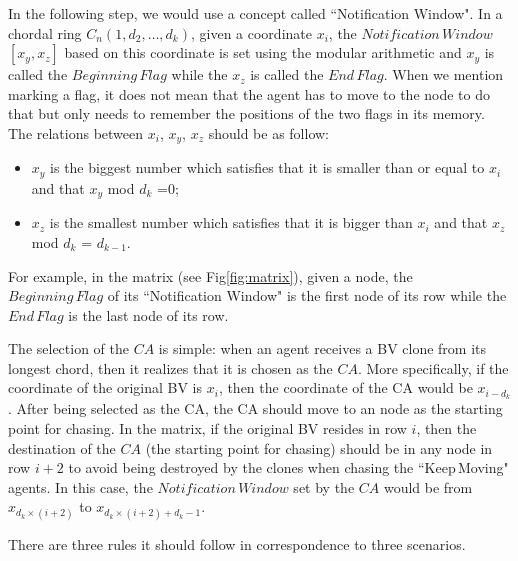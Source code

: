 In the following step, we would use a concept called ``Notification Window". In a chordal ring $C_n(1, d_2, \ldots, d_k)$, given a coordinate $x_i$, the $Notification\,Window$ $[x_y,x_z]$ based on this coordinate is set using the modular arithmetic and $x_y$ is called the $Beginning\,Flag$ while the $x_z$ is called the $End\,Flag$. When we mention marking a flag, it does not mean that the agent has to move to the node to do that but only needs to remember the positions of the two flags in its memory.
The relations between $x_i$, $x_y$, $x_z$ should be as follow: 
\begin{itemize}
\item $x_y$ is the biggest number which satisfies that it is smaller than or equal to $x_i$ and that $x_y$ mod $d_k$ =$0$; 
\item $x_z$ is the smallest number which satisfies that it is bigger than $x_i$ and that $x_z$ mod $d_k$ = $d_{k-1}$.
\end{itemize} 

For example, in the matrix (see Fig\ref{fig:matrix}), given a node, the $Beginning\,Flag$ of its ``Notification Window" is the first node of its row while the $End\,Flag$ is the last node of its row.

The selection of the $CA$ is simple: when an agent receives a BV clone from its longest chord, then it realizes that it is chosen as the $CA$. More specifically, if the coordinate of the original BV is $x_i$, then the coordinate of the CA would be $x_{i-d_k}$.
After being selected as the CA, the CA should move to an node as the starting point for chasing. In the matrix, if the original BV resides in row $i$, then the destination of the $CA$ (the starting point for chasing) should be in any node in row $i+2$ to avoid being destroyed by the clones when chasing the ``Keep\,Moving" agents. In this case, the $Notification\,Window$ set by the $CA$ would be from $x_{d_k\times(i+2)}$ to $x_{d_k\times(i+2) + d_{k}-1}$.

There are three rules it should follow in correspondence to three scenarios.  

